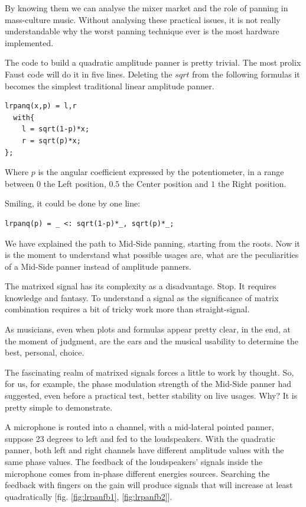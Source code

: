 \documentclass{article}
\begin{document}
By knowing them we can analyse the mixer market and the role of panning in mass-culture music. Without analysing these practical issues, it is not really understandable why the worst panning technique ever is the most hardware implemented.  

The code to build a quadratic amplitude panner is pretty trivial.
The most prolix Faust code will do it in five lines. Deleting the $sqrt$ from the following formulas it becomes the simplest traditional linear amplitude panner.  

\begin{lstlisting}
lrpanq(x,p) = l,r
  with{
    l = sqrt(1-p)*x;
    r = sqrt(p)*x;
};
\end{lstlisting}

Where $p$ is the angular coefficient expressed by the potentiometer, in a range between $0$ the Left position, $0.5$ the Center position and $1$ the Right position.

Smiling, it could be done by one line:

\begin{lstlisting}
lrpanq(p) = _ <: sqrt(1-p)*_, sqrt(p)*_;
\end{lstlisting}

We have explained the path to Mid-Side panning, starting from the roots. Now it is the moment to understand what possible usages are, what are the peculiarities of a Mid-Side panner instead of amplitude panners. 

The matrixed signal has its complexity as a disadvantage. Stop. It requires knowledge and fantasy. To understand a signal as the significance of matrix combination requires a bit of tricky work more than straight-signal. 

As musicians, even when plots and formulas appear pretty clear, in the end, at the moment of judgment, are the ears and the musical usability to determine the best, personal, choice.

The fascinating realm of matrixed signals forces a little to work by thought. So, for us, for example, the phase modulation strength of the Mid-Side panner had suggested, even before a practical test, better stability on live usages. Why? It is pretty simple to demonstrate.



A microphone is routed into a channel, with a mid-lateral pointed panner, suppose 23 degrees to left and fed to the loudspeakers. With the quadratic panner, both left and right channels have different amplitude values with the same phase values. The feedback of the loudspeakers' signals inside the microphone comes from in-phase different energies sources. Searching the feedback with fingers on the gain will produce signals that will increase at least quadratically [fig. \ref{fig:lrpanfb1}, \ref{fig:lrpanfb2}].
\end{document}
